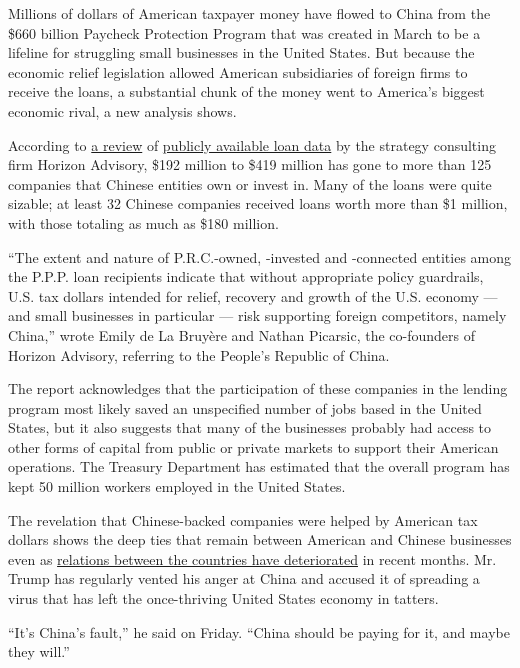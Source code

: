 Millions of dollars of American taxpayer money have flowed to China from
the \$660 billion Paycheck Protection Program that was created in March
to be a lifeline for struggling small businesses in the United States.
But because the economic relief legislation allowed American
subsidiaries of foreign firms to receive the loans, a substantial chunk
of the money went to America's biggest economic rival, a new analysis
shows.

According to \href{https://www.horizonadvisory.org/paycheckprotection}{a
review} of
\href{https://www.nytimes3xbfgragh.onion/2020/07/06/us/ppp-small-business-loans.html}{publicly
available loan data} by the strategy consulting firm Horizon Advisory,
\$192 million to \$419 million has gone to more than 125 companies that
Chinese entities own or invest in. Many of the loans were quite sizable;
at least 32 Chinese companies received loans worth more than \$1
million, with those totaling as much as \$180 million.

``The extent and nature of P.R.C.-owned, -invested and -connected
entities among the P.P.P. loan recipients indicate that without
appropriate policy guardrails, U.S. tax dollars intended for relief,
recovery and growth of the U.S. economy --- and small businesses in
particular --- risk supporting foreign competitors, namely China,''
wrote Emily de La Bruyère and Nathan Picarsic, the co-founders of
Horizon Advisory, referring to the People's Republic of China.

The report acknowledges that the participation of these companies in the
lending program most likely saved an unspecified number of jobs based in
the United States, but it also suggests that many of the businesses
probably had access to other forms of capital from public or private
markets to support their American operations. The Treasury Department
has estimated that the overall program has kept 50 million workers
employed in the United States.

The revelation that Chinese-backed companies were helped by American tax
dollars shows the deep ties that remain between American and Chinese
businesses even as
\href{https://www.nytimes3xbfgragh.onion/2020/07/25/world/asia/us-china-trump-xi.html}{relations
between the countries have deteriorated} in recent months. Mr. Trump has
regularly vented his anger at China and accused it of spreading a virus
that has left the once-thriving United States economy in tatters.

``It's China's fault,'' he said on Friday. ``China should be paying for
it, and maybe they will.''

